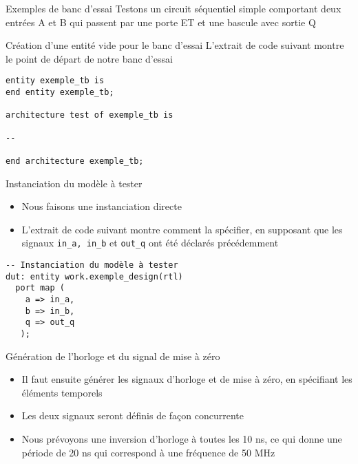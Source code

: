 \documentclass[presentation]{beamer}
\begin{document}
\begin{frame}[label={sec:org61b664b}]{Exemples de banc d'essai}
Testons un circuit séquentiel simple comportant deux entrées A et B qui passent par une porte ET et une bascule avec sortie Q
\end{frame}

\begin{frame}[label={sec:org2f1dd87},fragile]{Création d'une entité vide pour le banc d'essai}
 L'extrait de code suivant montre le point de départ de notre banc d'essai

\begin{verbatim}
entity exemple_tb is
end entity exemple_tb;

architecture test of exemple_tb is

--

end architecture exemple_tb;
\end{verbatim}
\end{frame}

\begin{frame}[label={sec:org586a485},fragile]{Instanciation du modèle à tester}
 \begin{itemize}
\item Nous faisons une instanciation directe
\item L'extrait de code suivant montre comment la spécifier, en supposant que les signaux \texttt{in\_a, in\_b} et \texttt{out\_q} ont été déclarés précédemment
\end{itemize}

\begin{verbatim}
-- Instanciation du modèle à tester 
dut: entity work.exemple_design(rtl)
  port map (
    a => in_a,
    b => in_b,
    q => out_q
   );
\end{verbatim}
\end{frame}

\begin{frame}[label={sec:orgc56f015}]{Génération de l'horloge et du signal de mise à zéro}
\begin{itemize}
\item Il faut ensuite générer les signaux d'horloge et de mise à zéro, en spécifiant les éléments temporels
\item Les deux signaux seront définis de façon concurrente
\item Nous prévoyons une inversion d'horloge à toutes les 10 ns, ce qui donne une période de 20 ns qui correspond à une fréquence de 50 MHz
\end{itemize}
\end{frame}
\end{document}
